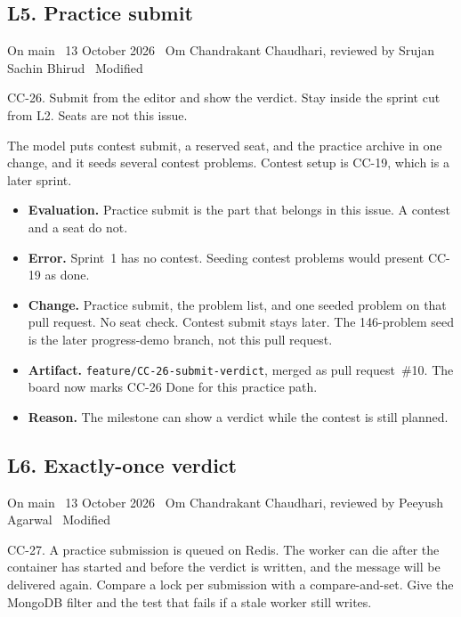 \documentclass[11pt,a4paper]{article}
\newcommand{\meta}[1]{{\footnotesize\color{quiet}#1}\par\vspace{0.2em}}
\newcommand{\step}[1]{\par\vspace{0.45em}{\bfseries #1}\par\vspace{0.05em}}
\begin{document}
\subsection{L5. Practice submit}
\meta{On main \textperiodcentered\ 13 October 2026 \textperiodcentered\ Om Chandrakant Chaudhari, reviewed by Srujan Sachin Bhirud \textperiodcentered\ Modified}

\step{1. Prompt}
CC-26. Submit from the editor and show the verdict. Stay inside the sprint cut from L2. Seats are not this issue.

\step{2. Reply (summarised)}
The model puts contest submit, a reserved seat, and the practice archive in one change, and it seeds several contest problems. Contest setup is CC-19, which is a later sprint.

\step{3. Decision}
\begin{itemize}
\item \textbf{Evaluation.} Practice submit is the part that belongs in this issue. A contest and a seat do not.
\item \textbf{Error.} Sprint~1 has no contest. Seeding contest problems would present CC-19 as done.
\item \textbf{Change.} Practice submit, the problem list, and one seeded problem on that pull request. No seat check. Contest submit stays later. The 146-problem seed is the later progress-demo branch, not this pull request.
\item \textbf{Artifact.} \texttt{feature/CC-26-submit-verdict}, merged as pull request~\#10. The board now marks CC-26 Done for this practice path.
\item \textbf{Reason.} The milestone can show a verdict while the contest is still planned.
\end{itemize}

\subsection{L6. Exactly-once verdict}
\meta{On main \textperiodcentered\ 13 October 2026 \textperiodcentered\ Om Chandrakant Chaudhari, reviewed by Peeyush Agarwal \textperiodcentered\ Modified}

\step{1. Prompt}
CC-27. A practice submission is queued on Redis. The worker can die after the container has started and before the verdict is written, and the message will be delivered again. Compare a lock per submission with a compare-and-set. Give the MongoDB filter and the test that fails if a stale worker still writes.
\end{document}
